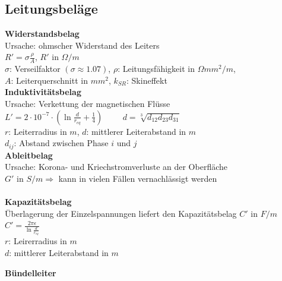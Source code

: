 	\subsection{Leitungsbeläge}
	\begin{multicols}{2}
		\textbf{Widerstandsbelag}\\
		Ursache: ohmscher Widerstand des Leiters \\
		$R' = \sigma \frac{\rho}{A}$, $R'$ in $\Omega/m$ \\
		$\sigma$: Verseilfaktor $\left(\sigma \approx 1.07\right)$, $\rho$: Leitungsfähigkeit in $\Omega mm^2/m$, \\
		$A$: Leiterquerschnitt in $mm^2$, $k_{SR}$: Skineffekt \\
		
		\textbf{Induktivitätsbelag}\\
		Ursache: Verkettung der magnetischen Flüsse \\
		$L' = 2 \cdot 10^{-7} \cdot \left(\ln \frac{d}{r_{eq}} + \frac{1}{4}\right) \hspace{1cm} d = \sqrt[3]{d_{12}d_{23}d_{31}}$ \\
		$r$: Leiterradius in $m$, $d$: mittlerer Leiterabstand in $m$ \\
		$d_{ij}$: Abstand zwischen Phase $i$ und $j$ \\
		
		\textbf{Ableitbelag} \\
		Ursache: Korona- und Kriechstromverluste an der Oberfläche\\
		$G'$ in $S/m \Rightarrow$ kann in vielen Fällen vernachlässigt werden\\ \\
		
		\textbf{Kapazitätsbelag}\\
		Überlagerung der Einzelspannungen liefert den Kapazitätsbelag $C'$ in $F/m$ \\
		$C' = \frac{2\pi \epsilon}{\ln \frac{d}{r_{eq}}}$\\
		$r$: Leirerradius in $m$ \\
		$d$: mittlerer Leiterabstand in $m$ \\ 
	\end{multicols}
	\textbf{Bündelleiter}\\
